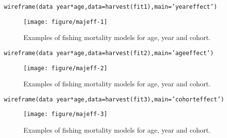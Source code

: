\documentclass[a4paper,english,10pt]{article}\usepackage[]{graphicx}\usepackage[]{color}
\makeatletter
\def\maxwidth{ %
  \ifdim\Gin@nat@width>\linewidth
    \linewidth
  \else
    \Gin@nat@width
  \fi
}
\newcommand{\hlstr}[1]{\textcolor[rgb]{0.2,0.2,0.2}{#1}}%
\newcommand{\hlopt}[1]{\textcolor[rgb]{0.2,0.2,0.2}{#1}}%
\newcommand{\hlstd}[1]{\textcolor[rgb]{0,0,0}{#1}}%
\newcommand{\hlkwc}[1]{\textcolor[rgb]{0.361,0.506,0.596}{#1}}%
\newcommand{\hlkwd}[1]{\textcolor[rgb]{0.361,0.506,0.596}{#1}}%
\newenvironment{kframe}{%
 \def\at@end@of@kframe{}%
 \ifinner\ifhmode%
  \def\at@end@of@kframe{\end{minipage}}%
  \begin{minipage}{\columnwidth}%
 \fi\fi%
 \def\FrameCommand##1{\hskip\@totalleftmargin \hskip-\fboxsep
 \colorbox{shadecolor}{##1}\hskip-\fboxsep
     \hskip-\linewidth \hskip-\@totalleftmargin \hskip\columnwidth}%
 \MakeFramed {\advance\hsize-\width
   \@totalleftmargin\z@ \linewidth\hsize
   \@setminipage}}%
 {\par\unskip\endMakeFramed%
 \at@end@of@kframe}
\newenvironment{knitrout}{}{} %
\makeatother
\begin{document}
\begin{knitrout}
\color{fgcolor}\begin{kframe}
\begin{alltt}
\hlkwd{wireframe}\hlstd{(data}\hlopt{~}\hlstd{year}\hlopt{*}\hlstd{age,} \hlkwc{data}\hlstd{=}\hlkwd{harvest}\hlstd{(fit1),} \hlkwc{main}\hlstd{=}\hlstr{'year effect'}\hlstd{)}
\end{alltt}
\end{kframe}\begin{figure}[H]

{\centering \texttt{[image: figure/majeff-1]} 

}

\caption[Examples of fishing mortality models for age, year and cohort]{Examples of fishing mortality models for age, year and cohort.\label{fig:majeff1}}
\end{figure}

\begin{kframe}\begin{alltt}
\hlkwd{wireframe}\hlstd{(data}\hlopt{~}\hlstd{year}\hlopt{*}\hlstd{age,} \hlkwc{data}\hlstd{=}\hlkwd{harvest}\hlstd{(fit2),} \hlkwc{main}\hlstd{=}\hlstr{'age effect'}\hlstd{)}
\end{alltt}
\end{kframe}\begin{figure}[H]

{\centering \texttt{[image: figure/majeff-2]} 

}

\caption[Examples of fishing mortality models for age, year and cohort]{Examples of fishing mortality models for age, year and cohort.\label{fig:majeff2}}
\end{figure}

\begin{kframe}\begin{alltt}
\hlkwd{wireframe}\hlstd{(data}\hlopt{~}\hlstd{year}\hlopt{*}\hlstd{age,} \hlkwc{data}\hlstd{=}\hlkwd{harvest}\hlstd{(fit3),} \hlkwc{main}\hlstd{=}\hlstr{'cohort effect'}\hlstd{)}
\end{alltt}
\end{kframe}\begin{figure}[H]

{\centering \texttt{[image: figure/majeff-3]} 

}

\caption[Examples of fishing mortality models for age, year and cohort]{Examples of fishing mortality models for age, year and cohort.\label{fig:majeff3}}
\end{figure}


\end{knitrout}
\end{document}
